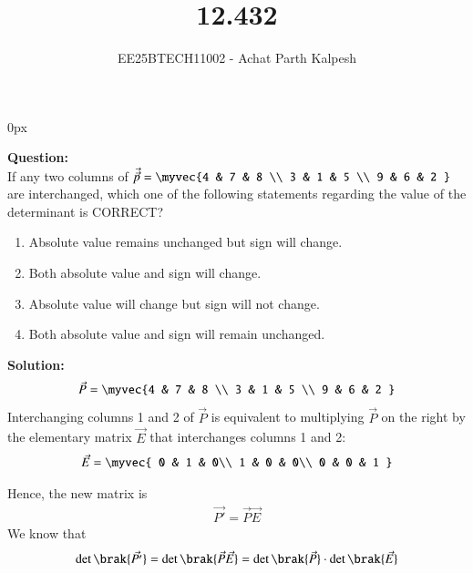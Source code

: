 \documentclass[journal]{IEEEtran}
\begin{document}

\title{12.432}
\author{EE25BTECH11002 - Achat Parth Kalpesh }
{\let\newpage\relax\maketitle}
\renewcommand{\thefigure}{\theenumi}
\renewcommand{\thetable}{\theenumi}
\setlength{\intextsep}{10pt} %
\renewcommand{\thetable}{\theenumi}
\parindent 0px



\textbf{Question:}\\
If any two columns of 
$\Vec{\vec{p}} = \myvec{4 & 7 & 8 \\
                  3 & 1 & 5 \\
                  9 & 6 & 2 }$
are interchanged, which one of the following statements regarding the value of the determinant is CORRECT?
\begin{enumerate}
\item Absolute value remains unchanged but sign will change.  
\item Both absolute value and sign will change.  
\item Absolute value will change but sign will not change.  
\item Both absolute value and sign will remain unchanged.  
\end{enumerate}


\textbf{Solution:}\\
\begin{align}
    \Vec{{P}} =  \myvec{4 & 7 & 8 \\
                  3 & 1 & 5 \\
                  9 & 6 & 2 }
\end{align}
Interchanging columns 1 and 2 of $\vec{P}$ is equivalent to multiplying $\vec{P}$ on the right by the elementary matrix $\vec{E}$ that interchanges columns 1 and 2:
\begin{align}
\vec{E} = \myvec{
0 & 1 & 0\\
1 & 0 & 0\\
0 & 0 & 1
}
\end{align}

Hence, the new matrix is
\begin{align}
\vec{P'} = \vec{P}\vec{E}
\end{align}
We know that
\begin{align}
\det\brak{\vec{P'}} = \det\brak{\vec{P}\vec{E}} = \det\brak{\vec{P}} \cdot \det\brak{\vec{E}}
\end{align}
\end{document}

